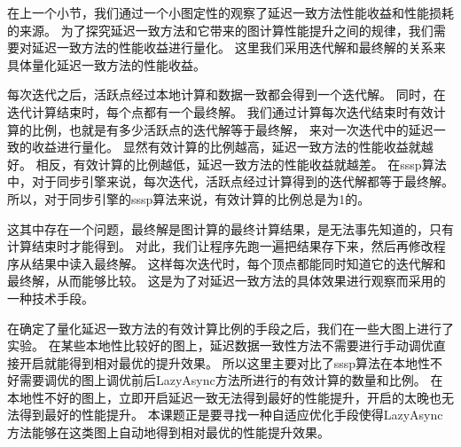 在上一个小节，我们通过一个小图定性的观察了延迟一致方法性能收益和性能损耗的来源。
为了探究延迟一致方法和它带来的图计算性能提升之间的规律，我们需要对延迟一致方法的性能收益进行量化。
这里我们采用迭代解和最终解的关系来具体量化延迟一致方法的性能收益。

每次迭代之后，活跃点经过本地计算和数据一致都会得到一个迭代解。
同时，在迭代计算结束时，每个点都有一个最终解。
我们通过计算每次迭代结束时有效计算的比例，也就是有多少活跃点的迭代解等于最终解，
来对一次迭代中的延迟一致的收益进行量化。
显然有效计算的比例越高，延迟一致方法的性能收益就越好。
相反，有效计算的比例越低，延迟一致方法的性能收益就越差。
在sssp算法中，对于同步引擎来说，每次迭代，活跃点经过计算得到的迭代解都等于最终解。
所以，对于同步引擎的sssp算法来说，有效计算的比例总是为1的。


这其中存在一个问题，最终解是图计算的最终计算结果，是无法事先知道的，只有计算结束时才能得到。
对此，我们让程序先跑一遍把结果存下来，然后再修改程序从结果中读入最终解。
这样每次迭代时，每个顶点都能同时知道它的迭代解和最终解，从而能够比较。
这是为了对延迟一致方法的具体效果进行观察而采用的一种技术手段。



在确定了量化延迟一致方法的有效计算比例的手段之后，我们在一些大图上进行了实验。
在某些本地性比较好的图上，延迟数据一致性方法不需要进行手动调优直接开启就能得到相对最优的提升效果。
所以这里主要对比了sssp算法在本地性不好需要调优的图上调优前后LazyAsync方法所进行的有效计算的数量和比例。
在本地性不好的图上，立即开启延迟一致无法得到最好的性能提升，开启的太晚也无法得到最好的性能提升。
本课题正是要寻找一种自适应优化手段使得LazyAsync方法能够在这类图上自动地得到相对最优的性能提升效果。

